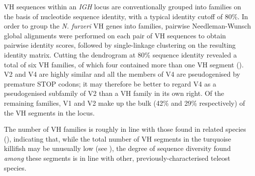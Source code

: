 	VH sequences within an \textit{IGH} locus are conventionally grouped into families on the basis of nucleotide sequence identity, with a typical identity cutoff of 80\%. In order to group the \textit{N. furzeri} VH genes into families, pairwise Needleman-Wunsch global alignments were performed on each pair of VH sequences to obtain pairwise identity scores, followed by single-linkage clustering on the resulting identity matrix. Cutting the dendrogram at 80\% sequence identity revealed a total of six VH families, of which four contained more than one VH segment (). 	V2 and V4 are highly similar and all the members of V4 are pseudogenised by premature STOP codons; it may therefore be better to regard V4 as a pseudogenised subfamily of V2 than a VH family in its own right. Of the remaining families, V1 and V2 make up the bulk (42\% and 29\% respectively) of the VH segments in the locus. 
	
	The number of VH families is roughly in line with those found in related species (), indicating that, while the total number of VH segments in the turquoise killifish may be unusually low (see ), the degree of sequence diversity found \textit{among} these segments is in line with other, previously-characterised teleost species. 
	

